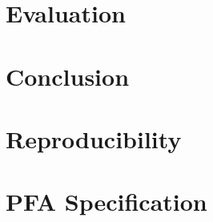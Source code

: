 \documentclass[12pt]{article}
\begin{document}
\section{Evaluation} \label{sec:eval}
    
            
\section{Conclusion} \label{sec:conclusion}
    

\listoftodos

\clearpage
\begin{appendices}
  \section{Reproducibility} \label{apx:reproduce}
  
  \section{PFA Specification} \label{apx:spec}
  
\end{appendices}

\clearpage
\printglossaries
\clearpage



\end{document}
